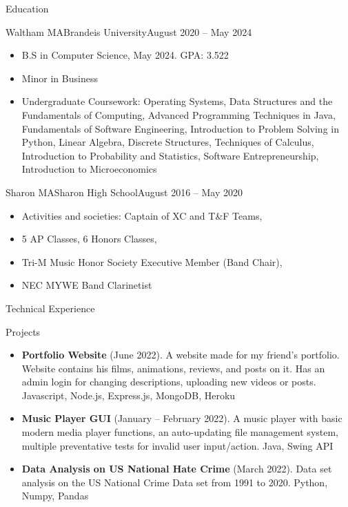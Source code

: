 \documentclass[]{mcdowellcv}
\begin{document}
	\begin{cvsection}{Education}
		\begin{cvsubsection}{Waltham MA}{Brandeis University}{August 2020 – May 2024}
			\begin{itemize}
				\item B.S in Computer Science, May 2024. GPA: 3.522
				\item Minor in Business
				\item Undergraduate Coursework: Operating Systems, Data Structures and the Fundamentals of Computing, Advanced Programming Techniques in Java, Fundamentals of Software Engineering, Introduction to Problem Solving in Python, Linear Algebra, Discrete Structures, Techniques of Calculus, Introduction to Probability and Statistics, Software Entrepreneurship, Introduction to Microeconomics
			\end{itemize}
		\end{cvsubsection}

		\begin{cvsubsection}{Sharon MA}{Sharon High School}{August 2016 – May 2020}
			\begin{itemize}
				\item Activities and societies: Captain of XC and T\&F Teams,
				\item 5 AP Classes, 6 Honors Classes,
				\item Tri-M Music Honor Society Executive Member (Band Chair),
				\item NEC MYWE Band Clarinetist
			\end{itemize}
		\end{cvsubsection}
	\end{cvsection}
	
	\begin{cvsection}{Technical Experience}
		\begin{cvsubsection}{Projects}{}{}
			\begin{itemize}
				\item \textbf{Portfolio Website} (June 2022). A website made for my friend’s portfolio. Website contains his films, animations, reviews, and posts on it. Has an admin login for changing descriptions, uploading new videos or posts. Javascript, Node.js, Express.js, MongoDB, Heroku
				\item \textbf{Music Player GUI} (January – February 2022). A music player with basic modern media player functions, an auto-updating file management system, multiple preventative tests for invalid user input/action. Java, Swing API
				\item \textbf{Data Analysis on US National Hate Crime} (March 2022). Data set analysis on the US National Crime Data set from 1991 to 2020. Python, Numpy, Pandas
			\end{itemize}
		\end{cvsubsection}
	\end{cvsection}
	
\end{document}
